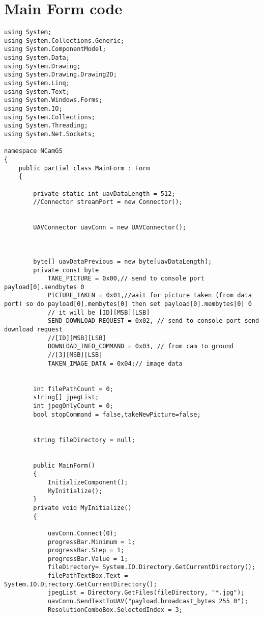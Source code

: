 
\lstset{numbers=left,
numberstyle=\footnotesize, 
stepnumber=2,numbersep=5pt}
\section{Main Form code}
\begin{lstlisting}[caption=Main Form of GUI, label=appen:main_form]
using System;
using System.Collections.Generic;
using System.ComponentModel;
using System.Data;
using System.Drawing;
using System.Drawing.Drawing2D;
using System.Linq;
using System.Text;
using System.Windows.Forms;
using System.IO;
using System.Collections;
using System.Threading;
using System.Net.Sockets;

namespace NCamGS
{
    public partial class MainForm : Form
    {
        
        private static int uavDataLength = 512;
        //Connector streamPort = new Connector();


        UAVConnector uavConn = new UAVConnector();

       

        byte[] uavDataPrevious = new byte[uavDataLength];
        private const byte
            TAKE_PICTURE = 0x00,// send to console port payload[0].sendbytes 0
            PICTURE_TAKEN = 0x01,//wait for picture taken (from data port) so do payload[0].membytes[0] then set payload[0].membytes[0] 0
            // it will be [ID][MSB][LSB]
            SEND_DOWNLOAD_REQUEST = 0x02, // send to console port send download request
            //[ID][MSB][LSB]
            DOWNLOAD_INFO_COMMAND = 0x03, // from cam to ground
            //[3][MSB][LSB]
            TAKEN_IMAGE_DATA = 0x04;// image data
        

        int filePathCount = 0;
        string[] jpegList;
        int jpegOnlyCount = 0;
        bool stopCommand = false,takeNewPicture=false;


        string fileDirectory = null;


        public MainForm()
        {
            InitializeComponent();
            MyInitialize();
        }
        private void MyInitialize()
        {

            uavConn.Connect(0);
            progressBar.Minimum = 1;
            progressBar.Step = 1;
            progressBar.Value = 1;
            fileDirectory= System.IO.Directory.GetCurrentDirectory();
            filePathTextBox.Text = System.IO.Directory.GetCurrentDirectory();
            jpegList = Directory.GetFiles(fileDirectory, "*.jpg");
            uavConn.SendTextToUAV("payload.broadcast_bytes 255 0");
            ResolutionComboBox.SelectedIndex = 3;


\end{lstlisting}

